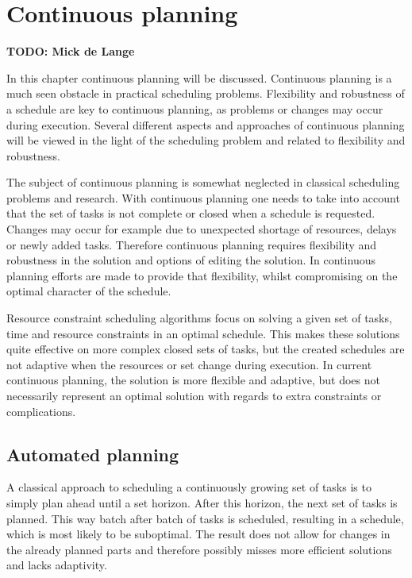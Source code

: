 \documentclass{article}
\newcommand{\TODO}[1]{{\color{red}\textbf{TODO: #1}}}
\begin{document}
\section{Continuous planning} \TODO{Mick de Lange}

In this chapter continuous planning will be discussed.
Continuous planning is a much seen obstacle in practical scheduling problems.
Flexibility and robustness of a schedule are key to continuous planning, as problems or changes may occur during execution.
Several different aspects and approaches of continuous planning will be viewed in the light of the scheduling problem and related to flexibility and robustness.

The subject of continuous planning is somewhat neglected in classical scheduling problems and research.
With continuous planning one needs to take into account that the set of tasks is not complete or closed when a schedule is requested.
Changes may occur for example due to unexpected shortage of resources, delays or newly added tasks.
Therefore continuous planning requires flexibility and robustness in the solution and options of editing the solution.
In continuous planning efforts are made to provide that flexibility, whilst compromising on the optimal character of the schedule.

Resource constraint scheduling algorithms focus on solving a given set of tasks, time and resource constraints in an optimal schedule.
This makes these solutions quite effective on more complex closed sets of tasks, but the created schedules are not adaptive when the resources or set change during execution.
In current continuous planning, the solution is more flexible and adaptive, but does not necessarily represent an optimal solution with regards to extra constraints or complications.
\cite{laborie03}

\subsection{Automated planning}

A classical approach to scheduling a continuously growing set of tasks is to simply plan ahead until a set horizon.
After this horizon, the next set of tasks is planned.
This way batch after batch of tasks is scheduled, resulting in a schedule, which is most likely to be suboptimal.
The result does not allow for changes in the already planned parts and therefore possibly misses more efficient solutions and lacks adaptivity.
\cite{chien00}
\end{document}
